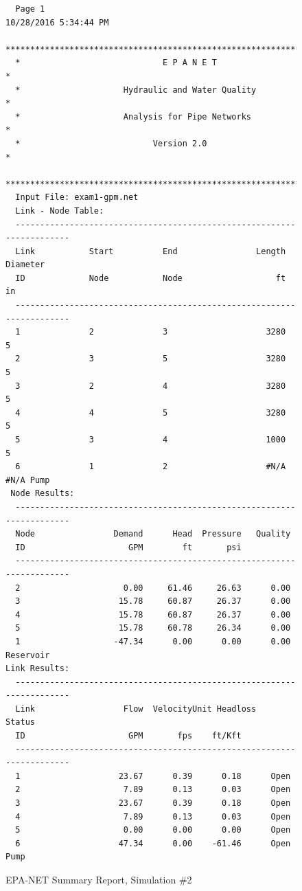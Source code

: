 \documentclass[11pt]{article}
\begin{document}
\begin{enumerate}
\begin{figure}[ht!] %
\centering
\begin{verbatim}
  Page 1                                           10/28/2016 5:34:44 PM
  **********************************************************************
  *                             E P A N E T                            *
  *                     Hydraulic and Water Quality                    *
  *                     Analysis for Pipe Networks                     *
  *                           Version 2.0                              *
  **********************************************************************
  Input File: exam1-gpm.net
  Link - Node Table:
  ----------------------------------------------------------------------
  Link           Start          End                Length  Diameter
  ID             Node           Node                   ft        in
  ----------------------------------------------------------------------
  1              2              3                    3280         5
  2              3              5                    3280         5
  3              2              4                    3280         5
  4              4              5                    3280         5
  5              3              4                    1000         5
  6              1              2                    #N/A      #N/A Pump
 Node Results:
  ----------------------------------------------------------------------
  Node                Demand      Head  Pressure   Quality
  ID                     GPM        ft       psi          
  ----------------------------------------------------------------------
  2                     0.00     61.46     26.63      0.00
  3                    15.78     60.87     26.37      0.00
  4                    15.78     60.87     26.37      0.00
  5                    15.78     60.78     26.34      0.00
  1                   -47.34      0.00      0.00      0.00 Reservoir
Link Results:
  ----------------------------------------------------------------------
  Link                  Flow  VelocityUnit Headloss    Status
  ID                     GPM       fps    ft/Kft
  ----------------------------------------------------------------------
  1                    23.67      0.39      0.18      Open
  2                     7.89      0.13      0.03      Open
  3                    23.67      0.39      0.18      Open
  4                     7.89      0.13      0.03      Open
  5                     0.00      0.00      0.00      Open
  6                    47.34      0.00    -61.46      Open Pump
  \end{verbatim}
     \caption{EPA-NET Summary Report, Simulation \#2}
   \label{fig:epanet2} 
\end{figure}


\end{enumerate}
\end{document}
